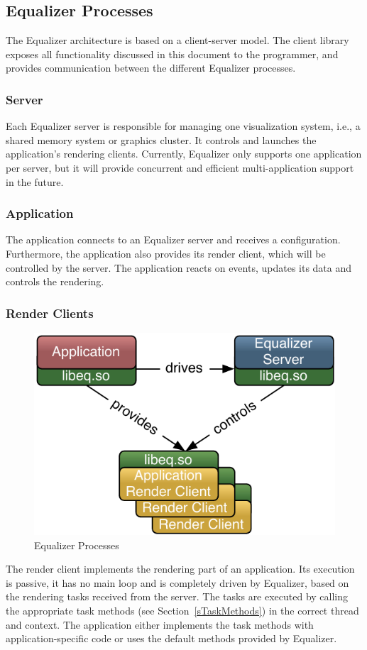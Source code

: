 \documentclass[10pt,a4]{scrartcl}
\newcommand{\sref}[1]{Section~\ref{#1}}
\begin{document}
\subsection{Equalizer Processes}

The Equalizer architecture is based on a client-server model. The client
library exposes all functionality discussed in this document to the
programmer, and provides communication between the different Equalizer
processes.

\subsubsection{Server}
Each Equalizer server is responsible for managing one visualization
system, i.e., a shared memory system or graphics cluster.  It controls
and launches the application's rendering clients.  Currently, Equalizer
only supports one application per server, but it will provide
concurrent and efficient multi-application support in the future.

\subsubsection{Application}

The application connects to an Equalizer server and receives a
configuration.  Furthermore, the application also provides its render
client, which will be controlled by the server. The application reacts
on events, updates its data and controls the rendering.

\subsubsection{Render Clients}

\begin{figure}
  \includegraphics[width=.618\textwidth]{images/processes.pdf}
  {\caption{\small\label{fProcesses}Equalizer Processes}}
\end{figure}
The render client implements the rendering part of an application. Its
execution is passive, it has no main loop and is completely driven by
Equalizer, based on the rendering tasks received from the server. The
tasks are executed by calling the appropriate task methods (see
\sref{sTaskMethods}) in the correct thread and context. The application
either implements the task methods with application-specific code or
uses the default methods provided by Equalizer.
\end{document}
